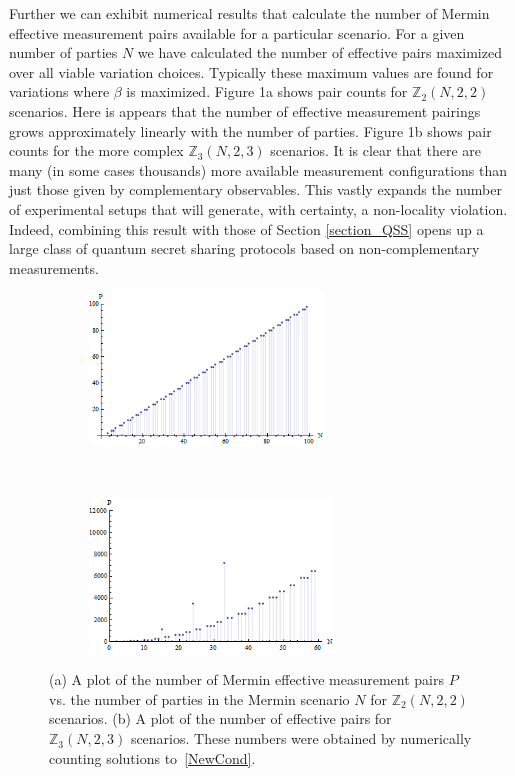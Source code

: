 Further we can exhibit numerical results that calculate the number of Mermin effective measurement pairs available for a particular scenario. For a given number of parties $N$ we have calculated the number of effective pairs maximized over all viable variation choices.  Typically these maximum values are found for variations where $\beta$ is maximized. Figure 1a shows pair counts for $\mathbb{Z}_2(N,2,2)$ scenarios. Here is appears that the number of effective measurement pairings grows approximately linearly with the number of parties. Figure 1b shows pair counts for the more complex $\mathbb{Z}_3(N,2,3)$ scenarios. It is clear that there are many (in some cases thousands) more available measurement configurations than just those given by complementary observables. This vastly expands the number of experimental setups that will generate, with certainty, a non-locality violation.  Indeed, combining this result with those of Section \ref{section_QSS} opens up a large class of quantum secret sharing protocols based on non-complementary measurements.

\begin{figure}[th]
    \label{counts}
    \centering
    \begin{subfigure}[t]{0.5\textwidth}
        \centering
        \includegraphics[height=1.6in]{images/countsA_2D}
        \caption{ }
    \end{subfigure}%
    ~ 
    \begin{subfigure}[t]{0.5\textwidth}
        \centering
        \includegraphics[height=1.6in]{images/counts_2D}
        \caption{ }
    \end{subfigure}
    \caption[Numerical counts of Mermin effective pairs.]{(a) A plot of the number of Mermin effective measurement pairs $P$ vs. the number of parties in the Mermin scenario $N$ for $\mathbb{Z}_2(N,2,2)$ scenarios. (b) A plot of the number of effective pairs for $\mathbb{Z}_3(N,2,3)$ scenarios. These numbers were obtained by numerically counting solutions to~\eqref{NewCond}.}
\end{figure}


